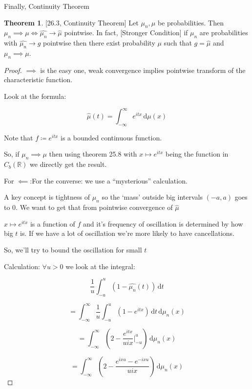 \documentclass{article}
\theoremstyle{definition}
\newtheorem{theorem}{Theorem}
\begin{document}
Finally, Continuity Theorem

\begin{theorem}

    [26.3, Continuity Theorem] Let \(\mu _n, \mu \) be probabilities. Then \(\mu_n \implies \mu \iff \hat{\mu_n} \to \hat{\mu}\) pointwise. In fact, [Stronger Condition] if \(\mu_n\) are probabilities with \(\hat{\mu_n} \to g \) pointwise then there exist probability \(\mu\) such that \(g = \hat{\mu}\) and \(\mu_n \implies \mu \).  

\end{theorem}

\begin{proof}
    \(\implies \) is the easy one, weak convergence implies pointwise transform of the characteristic function.

    Look at the formula:

    \[
        \hat{\mu}(t) = \int_{-\infty}^{\infty} e^{itx} \,\mathrm{d}\mu(x) 
    \]

    Note that \(f \coloneqq e^{itx}\) is a bounded continuous function.

    So, if \(\mu_n \implies \mu \) then using theorem 25.8 with \(x \mapsto e^{itx}\) being the function in \(C_b(\mathbb{R})\) we directly get the result.

    For \(\impliedby\):For the converse: we use a ``mysterious'' calculation.

    A key concept is tightness of \(\mu_n\) so the `mass' outside big intervals \((-a,a)\) goes to \(0\). We want to get that from pointwise convergence of \(\hat{\mu}\) 

    \(x \mapsto e^{itx}\) is a function of \(f\) and it's frequency of oscillation is determined by how big \(t\) is. If we have a lot of oscillation we're more likely to have cancellations.

    So, we'll try to bound the oscillation for small \(t\) 

    Calculation: \(\forall u > 0\) we look at the integral:

    \[
        \frac{1}{u}\int_{-u}^{u} (1 - \hat{\mu _n}(t)) \,\mathrm{d}t 
    \]

    \[
        = \int_{-\infty}^{\infty} \frac{1}{u}\int_{-u}^{u} (1 - e^{itx}) \,\mathrm{d}t  \,\mathrm{d}\mu_n(x)  
    \]

    \[
        = \int_{-\infty}^{\infty} \left( 2 - \frac{e^{itx}}{uix} \bigg|^u_{-u} \right)  \,\mathrm{d}\mu_n(x) 
    \]

    \[
        = \int_{-\infty}^{\infty} \left( 2 - \frac{e^{ixu}-e^{-ixu}}{uix} \right)  \,\mathrm{d}\mu_n(x) 
    \]


\end{proof}
\end{document}
